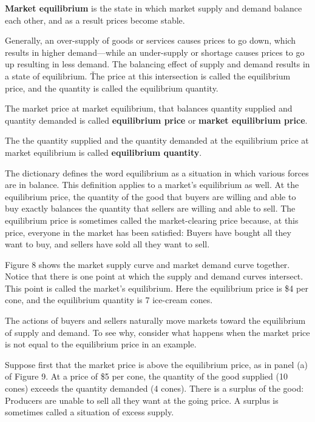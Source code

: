 \textbf{Market equilibrium} is the state in which market supply and demand balance each other, and as a result prices
become stable.
\ed

Generally, an over-supply of goods or services causes prices to go down, which results in higher demand—while an
under-supply or shortage causes prices to go up resulting in less demand. The balancing effect of supply and demand
results in a state of equilibrium. \v

The price at this intersection is called the equilibrium price, and the quantity is called the equilibrium quantity.

The market price at market equilibrium, that balances quantity supplied and quantity demanded is called
\textbf{equilibrium price} or \textbf{market equilibrium price}.
\ed

The the quantity supplied and the quantity demanded at the equilibrium price at market equilibrium is called
\textbf{equilibrium quantity}.
\ed

The dictionary defines the word equilibrium as a situation in which various forces are in balance. This definition
applies to a market's equilibrium as well. At the equilibrium price, the quantity of the good that buyers are willing
and able to buy exactly balances the quantity that sellers are willing and able to sell. The equilibrium price is
sometimes called the market-clearing price because, at this price, everyone in the market has been satisfied: Buyers
have bought all they want to buy, and sellers have sold all they want to sell.

\be
{}

Figure 8 shows the market supply curve and market demand curve together. Notice that there is one point at which the
supply and demand curves intersect. This point is called the market's equilibrium. Here the equilibrium price is \$4
per cone, and the equilibrium quantity is 7 ice-cream cones.
\ee

The actions of buyers and sellers naturally move markets toward the equilibrium of supply and demand. To see why,
consider what happens when the market price is not equal to the equilibrium price in an example.


Suppose first that the market price is above the equilibrium price, as in panel (a) of Figure 9. At a price of \$5
per cone, the quantity of the good supplied (10 cones) exceeds the quantity demanded (4 cones). There is a surplus of
the good: Producers are unable to sell all they want at the going price. A surplus is sometimes called a situation of
excess supply.

